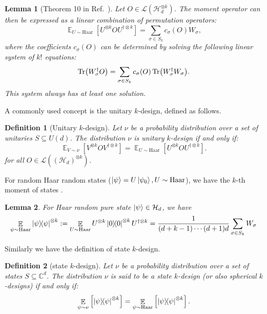 \documentclass[showpacs,amsmath,amssymb,twocolumn,aps,pra,superscriptaddress,notitlepage,10pt]{revtex4-2}
\newcommand{\bE}{\mathbb E}
\newtheorem{lemma}{Lemma}
\newtheorem{definition}{Definition}
\begin{document}
\begin{lemma}[Theorem 10 in Ref.~\cite{Mele_2024}]\label{lem: haar_random}
	Let $O\in\mathcal L(\mathcal H_d^{\otimes k})$. The moment operator can then be expressed as a linear combination of permutation operators:
	\begin{equation}
		\mathop{\mathbb E}_{U\sim \mathrm{Haar}}\left[U^{\otimes k}OU^{\dagger\otimes k}\right]=\sum_{\sigma\in S_k}c_{\sigma}(O)W_\sigma,
	\end{equation}
    where the coefficients $c_\sigma(O)$ can be determined by solving the following linear system of $k!$ equations:
    \begin{equation}
        \Tr(W_\sigma^\dagger O)=\sum_{\sigma\in S_k}c_\sigma(O)\Tr(W_\sigma^\dagger W_\sigma).
    \end{equation}
    This system always has at least one solution.
\end{lemma}
A commonly used concept is the unitary $k$-design, defined as follows.
\begin{definition}[Unitary $k$-design]
	Let $\nu$ be a probability distribution over a set of unitaries $S\subseteq U(d)$. The distribution $\nu$ is unitary $k$-design if and only if:
	\begin{equation}
		\mathop{\mathbb E}_{V\sim\nu}\left[V^{\otimes k}OV^{\dagger \otimes k}\right]=\mathop{\mathbb E}_{U\sim\mathrm{Haar}}\left[U^{\otimes k}OU^{\dagger\otimes k}\right].
	\end{equation}
    for all $O\in\mathcal L((\mathcal H_d)^{\otimes k})$.
\end{definition}
For random Haar random states ($\ket{\psi}=U\ket{\psi_0},U\sim\mathrm{Haar}$), we have the $k$-th moment of states \cite{harrow2013church}.
\begin{lemma}\label{lem:haar_random}
	For Haar random pure state $\ket{\psi}\in\mathcal{H}_d$, we have
	\begin{equation}
		\mathop{\mathbb E}_{\psi\sim \mathrm{Haar}}\ketbra{\psi}{\psi}^{\otimes k}:=\mathop{\bE}_{U\sim\mathrm{Haar}}U^{\otimes k}\ketbra{0}{0}^{\otimes k}U^{\dagger\otimes k}=\frac{1}{(d+k-1)\cdots(d+1)d}\sum_{\sigma\in S_k}W_\sigma
	\end{equation}
\end{lemma}
Similarly we have the definition of state $k$-design.
\begin{definition}[state $k$-design]
	Let $\nu$ be a probability distribution over a set of states $S\subseteq \mathbb{C}^d$. The distribution $\nu$ is said to be a state $k$-design (or also spherical $k$-designs) if and only if:
	\begin{equation}
		\mathop{\mathbb E}_{\psi\sim\nu}\left[\ketbra{\psi}{\psi}^{\otimes k}\right]=\mathop{\mathbb E}_{\psi\sim\mathrm{Haar}}\left[\ketbra{\psi}{\psi}^{\otimes k}\right].
	\end{equation}
\end{definition}
\end{document}
